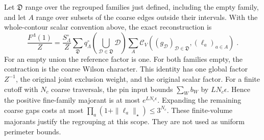 \documentclass[11pt]{article}
\begin{document}
Let $\mathfrak D$ range over the regrouped families just
defined, including the empty family, and let
$A$ range over subsets of the coarse edges outside their
intervals. With the whole-contour scalar convention above,
the exact reconstruction is
\begin{equation}\label{eq:c8-fourth-coarse-family-identity}
    \frac{F^\Lambda(1)}{Z}
        =\frac{S^\circ_\Lambda}{Z}
            \sum_{\mathfrak D}
                q^\circ_\Lambda
                    \left(\bigcup_{\mathcal D\in\mathfrak D}\mathcal D\right)
                \sum_A
                    \mathcal C_V
                        ((g_{\mathcal D})_{\mathcal D\in\mathfrak D},
                         (\ell_a)_{a\in A})\;.
\end{equation}
For an empty union the reference factor is one. For both
families empty, the contraction is the coarse Wilson character.
This identity has one global factor $Z^{-1}$, the original
joint exclusion weight, and the original scalar factor.
For a finite cutoff with $N_c$ coarse traversals, the pin
input bounds $\sum_W b_W$ by $LN_c\epsilon$. Hence the
positive fine-family majorant is at most $e^{LN_c\epsilon}$.
Expanding the remaining coarse gaps costs at most
$\prod_a(1+\|\ell_a\|_\star)\leq3^{N_c}$.
These finite-volume majorants justify the regrouping at this
scope. They are not used as uniform perimeter bounds.
\end{document}
